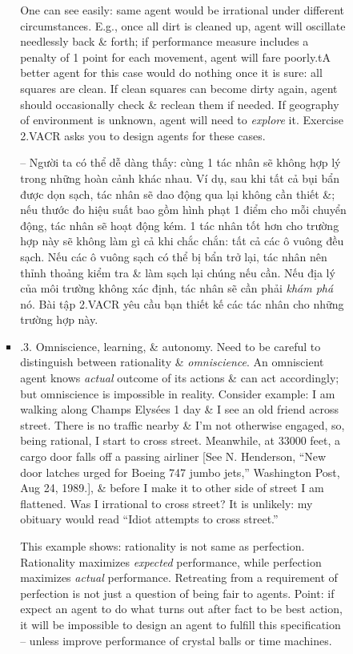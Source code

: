 \documentclass{article}
\begin{document}
\begin{itemize}
\begin{itemize}
\begin{itemize}
\begin{itemize}
				One can see easily: same agent would be irrational under different circumstances. E.g., once all dirt is cleaned up, agent will oscillate needlessly back \& forth; if performance measure includes a penalty of 1 point for each movement, agent will fare poorly.tA better agent for this case would do nothing once it is sure: all squares are clean. If clean squares can become dirty again, agent should occasionally check \& reclean them if needed. If geography of environment is unknown, agent will need to {\it explore} it. Exercise 2.VACR asks you to design agents for these cases.

				-- Người ta có thể dễ dàng thấy: cùng 1 tác nhân sẽ không hợp lý trong những hoàn cảnh khác nhau. Ví dụ, sau khi tất cả bụi bẩn được dọn sạch, tác nhân sẽ dao động qua lại không cần thiết \&; nếu thước đo hiệu suất bao gồm hình phạt 1 điểm cho mỗi chuyển động, tác nhân sẽ hoạt động kém. 1 tác nhân tốt hơn cho trường hợp này sẽ không làm gì cả khi chắc chắn: tất cả các ô vuông đều sạch. Nếu các ô vuông sạch có thể bị bẩn trở lại, tác nhân nên thỉnh thoảng kiểm tra \& làm sạch lại chúng nếu cần. Nếu địa lý của môi trường không xác định, tác nhân sẽ cần phải {\it khám phá} nó. Bài tập 2.VACR yêu cầu bạn thiết kế các tác nhân cho những trường hợp này.
				\item {.3. Omniscience, learning, \& autonomy.} Need to be careful to distinguish between rationality \& {\it omniscience}. An omniscient agent knows {\it actual} outcome of its actions \& can act accordingly; but omniscience is impossible in reality. Consider example: I am walking along Champs Elysées 1 day \& I see an old friend across street. There is no traffic nearby \& I'm not otherwise engaged, so, being rational, I start to cross street. Meanwhile, at 33000 feet, a cargo door falls off a passing airliner [See {\sc N. Henderson}, ``New door latches urged for Boeing 747 jumbo jets,'' Washington Post, Aug 24, 1989.], \& before I make it to other side of street I am flattened. Was I irrational to cross street? It is unlikely: my obituary would read ``Idiot attempts to cross street.''

				This example shows: rationality is not same as perfection. Rationality maximizes {\it expected} performance, while perfection maximizes {\it actual} performance. Retreating from a requirement of perfection is not just a question of being fair to agents. Point: if expect an agent to do what turns out after fact to be best action, it will be impossible to design an agent to fulfill this specification -- unless improve performance of crystal balls or time machines.


\end{itemize}
\end{itemize}
\end{itemize}
\end{itemize}
\end{document}
